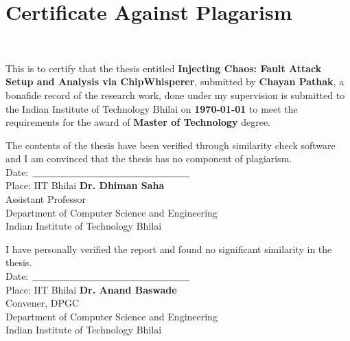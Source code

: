\chapter[Approval]{Certificate Against Plagarism}
\thispagestyle{myHeader}

\hspace{0pt plus 1filll} \\
  
 \begin{Spacing}{0.7}
 	\sffamily
 	
\noindent 	
This is to certify that the thesis entitled \textbf{Injecting Chaos: Fault Attack Setup and Analysis via ChipWhisperer}, submitted by \textbf{Chayan Pathak}, a bonafide record of the research work, done under my supervision is submitted to the Indian Institute of Technology Bhilai on {\bfseries \today} to meet the requirements for the award of {\bfseries Master of Technology} degree.

The contents of the thesis have been verified through similarity check software and I am convinced that the thesis has no component of plagiarism.\\

\vspace{3em}
\noindent
Date: \hspace{0pt plus 1filll} $\underline{\hspace{5.8cm}}$\\
Place: IIT Bhilai \hspace{0pt plus 1filll} \textbf{Dr. Dhiman Saha}\\
\hspace*{0pt plus 1filll} Assistant Professor\\
\hspace*{0pt plus 1filll} Department of Computer Science and Engineering\\
\hspace*{0pt plus 1filll} Indian Institute of Technology Bhilai



\vspace{4em}
I have personally verified the report and found no significant similarity in the thesis.\\

\vspace{3em}
\noindent
Date: \hspace{0pt plus 1filll} $\underline{\hspace{5.8cm}}$\\
Place: IIT Bhilai \hspace{0pt plus 1filll} \textbf{Dr. Anand Baswade}\\
\hspace*{0pt plus 1filll} Convener, DPGC\\
\hspace*{0pt plus 1filll} Department of Computer Science and Engineering\\
\hspace*{0pt plus 1filll} Indian Institute of Technology Bhilai

\end{Spacing}